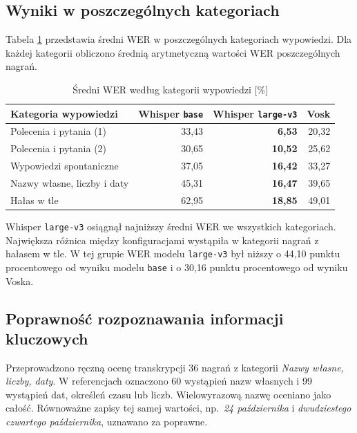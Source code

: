 \documentclass{article}
\begin{document}
\subsection{Wyniki w poszczególnych kategoriach}

Tabela \ref{tab:kategorie} przedstawia średni WER w poszczególnych
kategoriach wypowiedzi. Dla każdej kategorii obliczono
średnią arytmetyczną wartości WER poszczególnych nagrań.

\begin{table}[htbp]
\centering
\caption{Średni WER według kategorii wypowiedzi [\%]}
\label{tab:kategorie}
\begin{tabular}{lrrr}
\toprule
\textbf{Kategoria wypowiedzi} &
\textbf{Whisper \texttt{base}} &
\textbf{Whisper \texttt{large-v3}} &
\textbf{Vosk} \\
\midrule
Polecenia i pytania (1)         & 33,43 & \textbf{6,53}  & 20,32 \\
Polecenia i pytania (2)         & 30,65 & \textbf{10,52} & 25,62 \\
Wypowiedzi spontaniczne         & 37,05 & \textbf{16,42} & 33,27 \\
Nazwy własne, liczby i daty     & 45,31 & \textbf{16,47} & 39,65 \\
Hałas w tle                     & 62,95 & \textbf{18,85} & 49,01 \\
\bottomrule
\end{tabular}
\end{table}

Whisper \texttt{large-v3} osiągnął najniższy średni WER we wszystkich
kategoriach. Największa różnica między konfiguracjami wystąpiła
w kategorii nagrań z hałasem w tle. W tej grupie WER modelu
\texttt{large-v3} był niższy o 44,10 punktu procentowego od wyniku
modelu \texttt{base} i o 30,16 punktu procentowego od wyniku Voska.

\subsection{Poprawność rozpoznawania informacji kluczowych}

Przeprowadzono ręczną ocenę transkrypcji 36 nagrań z kategorii
\emph{Nazwy własne, liczby, daty}. W referencjach oznaczono
60 wystąpień nazw własnych i 99 wystąpień dat, określeń czasu lub liczb.
Wielowyrazową nazwę oceniano jako całość. Równoważne zapisy tej samej
wartości, np.\ \emph{24 października} i \emph{dwudziestego czwartego
października}, uznawano za poprawne.
\end{document}
